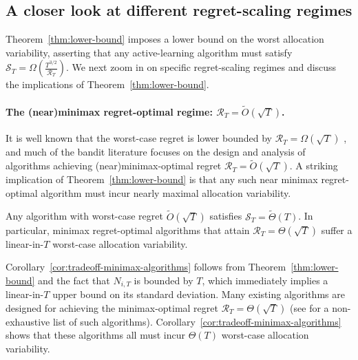 \documentclass[nonblindrev]{informs3_noinforms}
\begin{document}
{\subsection{A closer look at different regret-scaling regimes}\label{sec: closer look}
Theorem~\ref{thm:lower-bound} imposes a lower bound on the worst allocation variability, asserting that any active-learning algorithm must satisfy $\mathcal{S}_T = \Omega(\frac{T^{3/2}}{\mathcal{R}_T})$. We next zoom in on specific regret-scaling regimes and discuss the implications of Theorem~\ref{thm:lower-bound}.
\paragraph{The (near)minimax regret-optimal regime: $\mathcal{R}_T = \tilde{O}(\sqrt{T})$.} It is well known that the worst-case regret is lower bounded by $\mathcal{R}_T=\Omega(\sqrt{T})$ \cite{lattimore2020bandit}, and much of the bandit literature focuses on the design and analysis of algorithms achieving (near)minimax-optimal regret $\mathcal{R}_T=\tilde{O}(\sqrt{T})$. A striking implication of Theorem~\ref{thm:lower-bound} is that any such near minimax regret-optimal algorithm must incur nearly maximal allocation variability.
\begin{corollary}\label{cor:tradeoff-minimax-algorithms}
    Any algorithm with worst-case regret $\tilde{O}(\sqrt T)$ satisfies $\mathcal{S}_T = \tilde{\Theta}(T)$. In particular, minimax regret-optimal algorithms that attain $\mathcal{R}_T = \Theta(\sqrt{T})$ suffer a linear-in-$T$ worst-case allocation variability.
\end{corollary}
Corollary~\ref{cor:tradeoff-minimax-algorithms} follows from Theorem~\ref{thm:lower-bound} and the fact that $N_{i,T}$ is bounded by $T$, which immediately implies a linear-in-$T$ upper bound on its standard deviation. Many existing algorithms are designed for achieving the minimax-optimal regret $\mathcal{R}_T = \Theta(\sqrt{T})$ {(see  for a non-exhaustive list of such algorithms)}. Corollary~\ref{cor:tradeoff-minimax-algorithms} shows that these algorithms all must incur $\Theta(T)$ worst-case allocation variability. 


}
\end{document}
